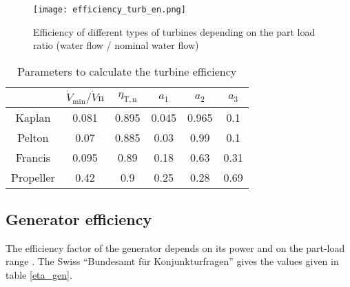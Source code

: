\begin{figure}[H]
\texttt{[image: efficiency\_turb\_en.png]}
\caption[Efficiency of different types of turbines depending on the part load ratio]{Efficiency of different types of turbines depending on the part load ratio (water flow / nominal water flow) \cite{raa89}}
\centering
\label{efficiency_turb}
\end{figure}


\begin{table}
 \caption[Parameters to calculate the turbine efficiency]{Parameters to calculate the turbine efficiency \cite{quaschning}}
 \label{eff_param}
 \centering
 \begin{tabular}{|c|c|c|c|c|c|}
  \cline{2-6}
  \multicolumn{1}{c|}{}&$\dot{V}_\mathrm{min} / \dot{V}\mathrm{n}$ & $\eta_\mathrm{T,n}$& $a_\mathrm{1}$ & $a_\mathrm{2}$&$a_\mathrm{3}$ \\ 
  \hline
  Kaplan & 0.081& 0.895& 0.045 &0.965& 0.1 \\
  Pelton & 0.07& 0.885& 0.03& 0.99& 0.1\\
  Francis &0.095 &0.89 &0.18 &0.63 &0.31 \\
  Propeller &0.42 &0.9 &0.25 &0.28 &0.69\\
  \hline
 \end{tabular}
\end{table}

\subsection{Generator efficiency}
\label{sub:gen_eff}

The efficiency factor of the generator depends on its power and on the part-load range \cite{pacer}. The Swiss ``Bundesamt für Konjunkturfragen'' gives the values given in table \ref{eta_gen}.

